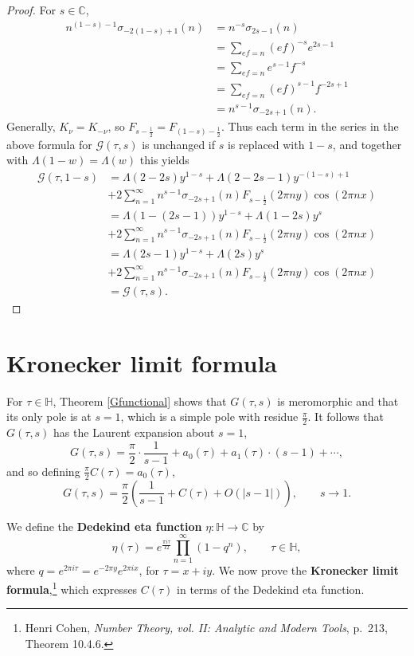 \documentclass{article}
\theoremstyle{definition}
\theoremstyle{definition}
\begin{document}
\begin{proof}
For $s \in \mathbb{C}$, 
\begin{align*}
n^{(1-s)-1}\sigma_{-2(1-s)+1}(n) &= n^{-s} \sigma_{2s-1}(n) \\
&= \sum_{ef=n} (ef)^{-s} e^{2s-1}\\
&=\sum_{ef=n}e^{s-1} f^{-s}\\
&=\sum_{ef=n} (ef)^{s-1} f^{-2s+1}\\
&=n^{s-1} \sigma_{-2s+1}(n).
\end{align*}
Generally, $K_\nu=K_{-\nu}$, so $F_{s-\frac{1}{2}} = F_{(1-s)-\frac{1}{2}}$. 
Thus each term in the series in the above formula for $\mathcal{G}(\tau,s)$ is unchanged if $s$ is replaced with $1-s$,
and together with $\Lambda(1-w)=\Lambda(w)$ this yields
\begin{align*}
\mathcal{G}(\tau,1-s)&=\Lambda(2-2s)y^{1-s} + \Lambda(2-2s-1)y^{-(1-s)+1}\\
&+2\sum_{n=1}^\infty n^{s-1} \sigma_{-2s+1}(n) F_{s-\frac{1}{2}}(2\pi ny) \cos(2\pi nx)\\
&=\Lambda(1-(2s-1)) y^{1-s}+\Lambda(1-2s)y^s\\
&+2\sum_{n=1}^\infty n^{s-1} \sigma_{-2s+1}(n) F_{s-\frac{1}{2}}(2\pi ny) \cos(2\pi nx)\\
&=\Lambda(2s-1)y^{1-s}+\Lambda(2s)y^s\\
&+2\sum_{n=1}^\infty n^{s-1} \sigma_{-2s+1}(n) F_{s-\frac{1}{2}}(2\pi ny) \cos(2\pi nx)\\
&=\mathcal{G}(\tau,s).
\end{align*}
\end{proof}


\section{Kronecker limit formula}
For $\tau \in \mathbb{H}$,
Theorem \ref{Gfunctional} shows that $G(\tau,s)$ is meromorphic and that its only pole is at $s=1$, which is a simple pole with residue $\frac{\pi}{2}$. It follows that
$G(\tau,s)$ has the Laurent expansion about $s=1$,
\[
G(\tau,s) = \frac{\pi}{2}\cdot \frac{1}{s-1}+a_0(\tau) + a_1(\tau)\cdot (s-1)+\cdots,
\]
and so defining $\frac{\pi}{2}C(\tau)=a_0(\tau)$,
\[
G(\tau,s) = \frac{\pi}{2}\left(\frac{1}{s-1}+C(\tau)+O(|s-1|)\right), \qquad  s \to 1.
\]


We define the \textbf{Dedekind eta function}  $\eta:\mathbb{H} \to \mathbb{C}$ by
\[
\eta(\tau)  = e^{\frac{\pi i\tau}{12}} \prod_{n=1}^\infty (1-q^n), \qquad \tau \in \mathbb{H},
\]
where $q=e^{2\pi i\tau} = e^{-2\pi y}e^{2\pi ix}$, for $\tau=x+iy$. We now prove the \textbf{Kronecker limit formula},\footnote{Henri Cohen, {\em Number Theory, vol. II: Analytic and Modern Tools}, p.~213, Theorem 10.4.6.} which expresses $C(\tau)$ in terms of the Dedekind eta function.
\end{document}
